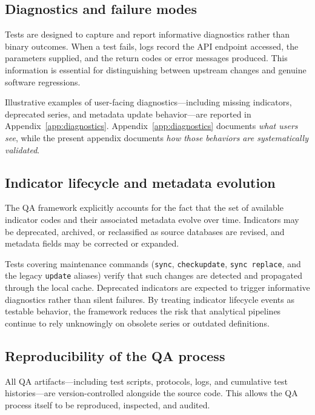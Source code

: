 \documentclass[bib]{statapress}
\begin{document}
\subsection{Diagnostics and failure modes}

Tests are designed to capture and report informative diagnostics rather than
binary outcomes. When a test fails, logs record the API endpoint accessed, the
parameters supplied, and the return codes or error messages produced. This
information is essential for distinguishing between upstream changes and genuine
software regressions.

Illustrative examples of user-facing diagnostics—including missing indicators,
deprecated series, and metadata update behavior—are reported in Appendix~\ref{app:diagnostics}.
Appendix~\ref{app:diagnostics} documents \emph{what users see}, while the present appendix documents
\emph{how those behaviors are systematically validated}.

\subsection{Indicator lifecycle and metadata evolution}

The QA framework explicitly accounts for the fact that the set of available
indicator codes and their associated metadata evolve over time. Indicators may
be deprecated, archived, or reclassified as source databases are revised, and
metadata fields may be corrected or expanded.

Tests covering maintenance commands (\texttt{sync}, \texttt{checkupdate},
\texttt{sync replace}, and the legacy \texttt{update} aliases) verify that
such changes are detected and propagated through the local cache. Deprecated
indicators are expected to trigger informative
diagnostics rather than silent failures. By treating indicator lifecycle events
as testable behavior, the framework reduces the risk that analytical pipelines
continue to rely unknowingly on obsolete series or outdated definitions.

\subsection{Reproducibility of the QA process}

All QA artifacts—including test scripts, protocols, logs, and cumulative test
histories—are version-controlled alongside the source code. This allows the QA
process itself to be reproduced, inspected, and audited.
\end{document}
